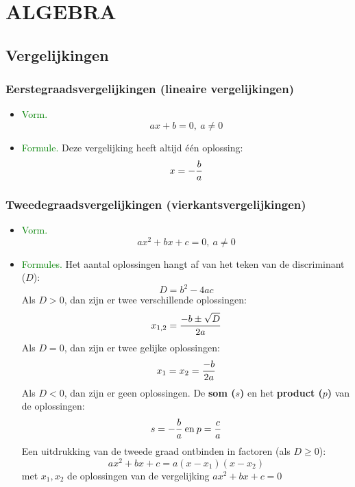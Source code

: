 \section{ALGEBRA} \label{algebra}
\hypertarget{algebra}{}

\subsection{Vergelijkingen} \label{vergelijkingen}
\hypertarget{vergelijkingen}{}

\subsubsection{Eerstegraadsvergelijkingen (lineaire vergelijkingen)} \label{eerstegraadsvergelijkingen}
\hypertarget{eerstegraadsvergelijkingen}{}
		\begin{itemize}%
		\item \textcolor{green}{Vorm.}
		\[ax+b=0, \: a\neq 0\]
		\item\textcolor{green}{Formule.}\newline
		Deze vergelijking heeft altijd \'e\'en oplossing: 
		\[x=-\displaystyle\frac{\displaystyle b}{\displaystyle a}\]
		\end{itemize}%

\subsubsection{Tweedegraadsvergelijkingen (vierkantsvergelijkingen)} \label{vierkantsvergelijkingen}
\hypertarget{vierkantsvergelijkingen}{}
		\begin{itemize}%
		\item \textcolor{green}{Vorm.}
		\[ax^2+bx+c=0, \: a\neq 0\]
		\item\textcolor{green}{Formules.}\newline
		Het aantal oplossingen hangt af van het teken van de discriminant ($D$):
		\[D=b^2-4ac\]
		Als $D>0$, dan zijn er twee verschillende oplossingen:
		\[x_{1,2}=\displaystyle\frac{\displaystyle -b\pm \sqrt{D}}{\displaystyle 2a}\]
		Als $D=0$, dan zijn er twee gelijke oplossingen:
		\[x_1=x_2=\displaystyle\frac{\displaystyle -b}{\displaystyle 2a}\]
		Als $D<0$, dan zijn er geen oplossingen.\newline\newline
		De \hypertarget{som_en_product}{{\bf som ($s$)} en het {\bf product ($p$)}} van de oplossingen:
		\label{som_en_product}
		\[s=-\displaystyle\frac{\displaystyle b}{\displaystyle a}\:\mbox{en}\:p=\displaystyle\frac{\displaystyle c}{\displaystyle a}\]\newline
		Een uitdrukking van de tweede graad ontbinden in factoren (als $D\geq 0$):\vskip 		0.5cm
		\[ax^2+bx+c=a(x-x_1)(x-x_2)\]met $x_1, x_2$ de oplossingen van de vergelijking
		$ax^2+bx+c=0$
		\end{itemize}%


